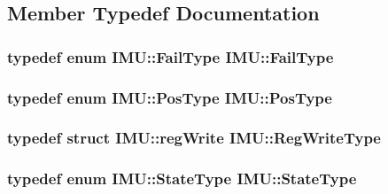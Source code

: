 \subsection{Member Typedef Documentation}
\hypertarget{class_i_m_u_a4baf4d6e504dcb71c4afab34be225620}{
\subsubsection[{FailType}]{\setlength{\rightskip}{0pt plus 5cm}typedef enum {\bf IMU::FailType}  {\bf IMU::FailType}}}
\label{class_i_m_u_a4baf4d6e504dcb71c4afab34be225620}
\hypertarget{class_i_m_u_ad82ee88c050235081f004f81a5724e09}{
\subsubsection[{PosType}]{\setlength{\rightskip}{0pt plus 5cm}typedef enum {\bf IMU::PosType}  {\bf IMU::PosType}}}
\label{class_i_m_u_ad82ee88c050235081f004f81a5724e09}
\hypertarget{class_i_m_u_a1960eeaec92b6b60d4f6c9e28b042b80}{
\subsubsection[{RegWriteType}]{\setlength{\rightskip}{0pt plus 5cm}typedef struct {\bf IMU::regWrite}  {\bf IMU::RegWriteType}}}
\label{class_i_m_u_a1960eeaec92b6b60d4f6c9e28b042b80}
\hypertarget{class_i_m_u_a2c1f560a0bc80d0bd06bb56a614aeedd}{
\subsubsection[{StateType}]{\setlength{\rightskip}{0pt plus 5cm}typedef enum {\bf IMU::StateType}  {\bf IMU::StateType}}}
\label{class_i_m_u_a2c1f560a0bc80d0bd06bb56a614aeedd}


